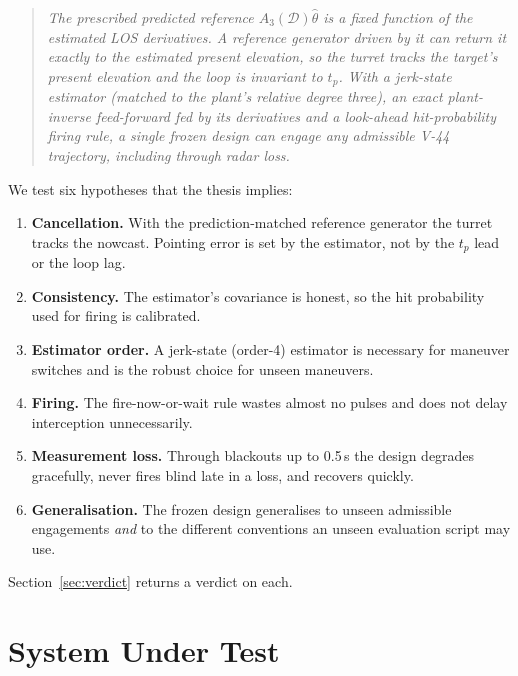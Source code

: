 \documentclass[11pt,a4paper]{article}
\newcommand{\D}{\mathcal{D}}
\begin{document}
\begin{quote}
\emph{The prescribed predicted reference $A_3(\D)\hat\theta$ is a fixed function of the estimated LOS derivatives. A reference generator driven by it can return it exactly to the estimated present elevation, so the turret tracks the target's present elevation and the loop is invariant to $t_p$. With a jerk-state estimator (matched to the plant's relative degree three), an exact plant-inverse feed-forward fed by its derivatives and a look-ahead hit-probability firing rule, a single frozen design can engage any admissible V-44 trajectory, including through radar loss.}
\end{quote}

\noindent We test six hypotheses that the thesis implies:
\begin{enumerate}[label=\textbf{H\arabic*}]
\item \textbf{Cancellation.} With the prediction-matched reference generator the turret tracks the nowcast. Pointing error is set by the estimator, not by the $t_p$ lead or the loop lag.
\item \textbf{Consistency.} The estimator's covariance is honest, so the hit probability used for firing is calibrated.
\item \textbf{Estimator order.} A jerk-state (order-4) estimator is necessary for maneuver switches and is the robust choice for unseen maneuvers.
\item \textbf{Firing.} The fire-now-or-wait rule wastes almost no pulses and does not delay interception unnecessarily.
\item \textbf{Measurement loss.} Through blackouts up to 0.5\,s the design degrades gracefully, never fires blind late in a loss, and recovers quickly.
\item \textbf{Generalisation.} The frozen design generalises to unseen admissible engagements \emph{and} to the different conventions an unseen evaluation script may use.
\end{enumerate}
Section~\ref{sec:verdict} returns a verdict on each.

\section{System Under Test}
\end{document}
